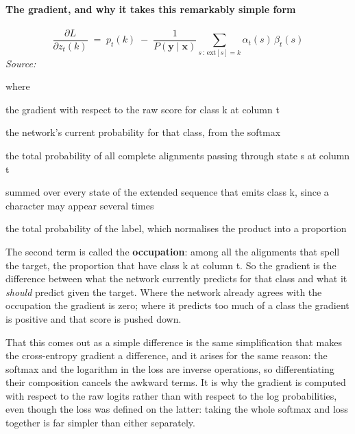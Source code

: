 \paragraph{The gradient, and why it takes this remarkably simple form}

\begin{equation}
\frac{\partial L}{\partial z_t(k)} \;=\; p_t(k) \;-\; \frac{1}{P(\mathbf{y}\mid\mathbf{x})} \!\!\sum_{s \,:\, \mathrm{ext}[s] = k} \!\! \alpha_t(s)\,\beta_t(s)
\end{equation}
\noindent\emph{Source: }\cite{graves2006}


\noindent where
\begin{description}[leftmargin=2.4em,style=nextline,font=\normalfont\ttfamily]\setlength\itemsep{1pt}
  \item[{$\frac{\partial L}{\partial z_t(k)}$}] \normalfont the gradient with respect to the raw score for class k at column t
  \item[{$p_t(k)$}] \normalfont the network's current probability for that class, from the softmax
  \item[{$\alpha_t(s)\beta_t(s)$}] \normalfont the total probability of all complete alignments passing through state s at column t
  \item[{$\sum_{s : \mathrm{ext}[s]=k}$}] \normalfont summed over every state of the extended sequence that emits class k, since a character may appear several times
  \item[{$P(\mathbf{y}\mid\mathbf{x})$}] \normalfont the total probability of the label, which normalises the product into a proportion
\end{description}
The second term is called the \textbf{occupation}: among all the alignments that spell the target, the proportion that have class k at column t. So the gradient is the difference between what the network currently predicts for that class and what it \emph{should} predict given the target. Where the network already agrees with the occupation the gradient is zero; where it predicts too much of a class the gradient is positive and that score is pushed down.

That this comes out as a simple difference is the same simplification that makes the cross-entropy gradient a difference, and it arises for the same reason: the softmax and the logarithm in the loss are inverse operations, so differentiating their composition cancels the awkward terms. It is why the gradient is computed with respect to the raw logits rather than with respect to the log probabilities, even though the loss was defined on the latter: taking the whole softmax and loss together is far simpler than either separately.


